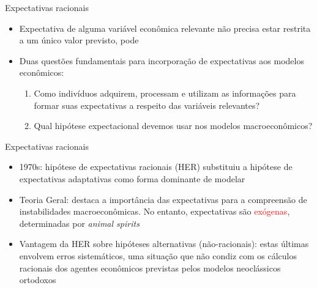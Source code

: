 \documentclass[10pt]{beamer}
\begin{document}
\begin{frame}{Expectativas racionais}
    \begin{itemize}
        \item Expectativa de alguma variável econômica relevante não precisa estar restrita a um único valor previsto, pode 
        \bigskip
        \item Duas questões fundamentais para incorporação de expectativas aos modelos econômicos:
        \bigskip
        \begin{enumerate}
            \item Como indivíduos adquirem, processam e utilizam as informações para formar suas expectativas a respeito das variáveis relevantes?
            \bigskip
            \item Qual hipótese expectacional devemos usar nos modelos macroeconômicos?
        \end{enumerate}
    \end{itemize}
\end{frame}

\begin{frame}{Expectativas racionais}
    \begin{itemize}
        \item 1970s: hipótese de expectativas racionais (HER) substituiu a hipótese de expectativas adaptativas como forma dominante de modelar 
        \bigskip
        \item Teoria Geral: destaca a importância das expectativas para a compreensão de instabilidades macroeconômicas. No entanto, expectativas são \textcolor{red}{exógenas}, determinadas por \emph{animal spirits}
        \bigskip
        \item Vantagem da HER sobre hipóteses alternativas (não-racionais): estas últimas envolvem erros sistemáticos, uma situação que não condiz com os cálculos racionais dos agentes econômicos previstas pelos modelos neoclássicos ortodoxos
    \end{itemize}
\end{frame}
\end{document}
